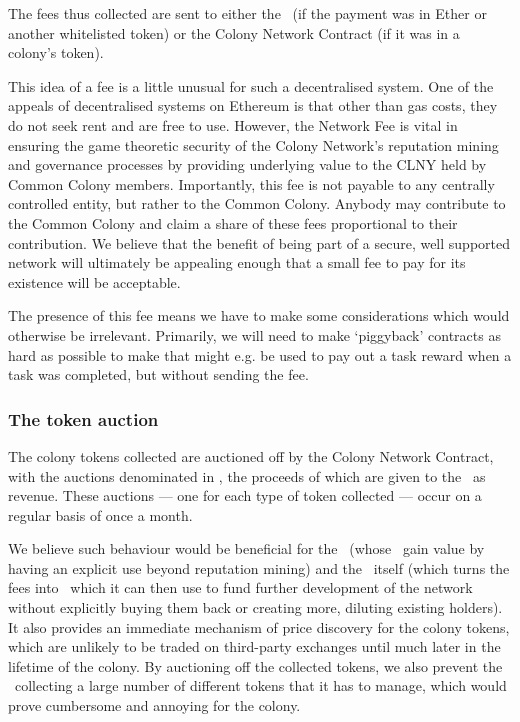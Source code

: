 The fees thus collected are sent to either the \rc\ (if the payment was in Ether or another whitelisted token) or the Colony Network Contract (if it was in a colony's token).

This idea of a fee is a little unusual for such a decentralised system. One of the appeals of decentralised systems on Ethereum is that other than gas costs, they do not seek rent and are free to use. However, the Network Fee is vital in ensuring the game theoretic security of the Colony Network's reputation mining and governance processes by providing underlying value to the CLNY held by Common Colony members. Importantly, this fee is not payable to any centrally controlled entity, but rather to the Common Colony. Anybody may contribute to the Common Colony and claim a share of these fees proportional to their contribution. We believe that the benefit of being part of a secure, well supported network will ultimately be appealing enough that a small fee to pay for its existence will be acceptable.

The presence of this fee means we have to make some considerations which would otherwise be irrelevant. Primarily, we will need to make `piggyback' contracts as hard as possible to make that might e.g. be used to pay out a task reward when a task was completed, but without sending the fee. 

\subsubsection{The token auction}
The colony tokens collected are auctioned off by the Colony Network Contract, with the auctions denominated in \rcts, the proceeds of which are given to the \rc\ as revenue. These auctions --- one for each type of token collected --- occur on a regular basis of once a month.

We believe such behaviour would be beneficial for the \rcths\ (whose \rcts\ gain value by having an explicit use beyond reputation mining) and the \rc\ itself (which turns the fees into \rcts\ which it can then use to fund further development of the network without explicitly buying them back or creating more, diluting existing holders). It also provides an immediate mechanism of price discovery for the colony tokens, which are unlikely to be traded on third-party exchanges until much later in the lifetime of the colony. By auctioning off the collected tokens, we also prevent the \rc\ collecting a large number of different tokens that it has to manage, which would prove cumbersome and annoying for the colony.



